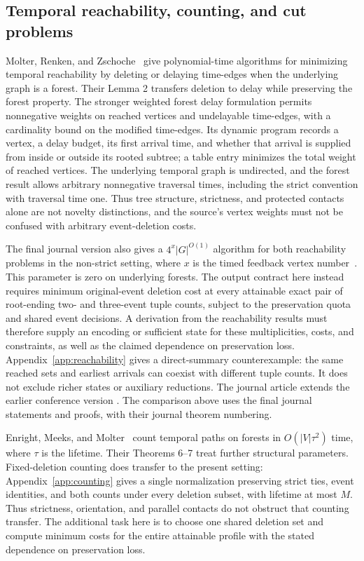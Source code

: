 \subsection{Temporal reachability, counting, and cut problems}

Molter, Renken, and Zschoche~\citep[Theorem 14]{molter2024} give
polynomial-time algorithms for minimizing temporal reachability by deleting
or delaying time-edges when the underlying graph is a forest. Their
Lemma 2 transfers deletion to delay while preserving the forest property.
The stronger weighted forest delay formulation
\citep[Theorem 15, pp.~10--12]{molter2024} permits nonnegative weights on
reached vertices and undelayable time-edges, with a cardinality bound on
the modified time-edges. Its dynamic program records a vertex, a delay
budget, its first arrival time, and whether that arrival is supplied from
inside or outside its rooted subtree; a table entry minimizes the total
weight of reached vertices. The underlying temporal graph is undirected,
and the forest result allows arbitrary nonnegative traversal times,
including the strict convention with traversal time one. Thus tree
structure, strictness, and protected contacts alone are not novelty
distinctions, and the source's vertex weights must not be confused with
arbitrary event-deletion costs.

The final journal version also gives a $4^x|G|^{O(1)}$ algorithm for both
reachability problems in the non-strict setting, where $x$ is the timed
feedback vertex number~\citep[Theorem 16]{molter2024}. This parameter is
zero on underlying forests. The output contract here instead requires
minimum original-event deletion cost at every attainable exact pair of
root-ending two- and three-event tuple counts, subject to the preservation
quota and shared event decisions. A derivation from the reachability
results must therefore supply an encoding or sufficient state for these
multiplicities, costs, and constraints, as well as the claimed dependence
on preservation loss. Appendix~\ref{app:reachability} gives a direct-summary
counterexample: the same reached sets and earliest arrivals can coexist
with different tuple counts. It does not exclude richer states or auxiliary
reductions. The journal article extends the earlier conference version
\citep{molter2021}. The comparison above uses the final journal
statements and proofs, with their journal theorem numbering.

Enright, Meeks, and Molter~\citep[Theorem 2]{enright2025counting} count temporal
paths on forests in $O(|V|\tau^2)$ time, where $\tau$ is the lifetime. Their
Theorems 6--7 treat further structural parameters. Fixed-deletion counting
does transfer to the present setting: Appendix~\ref{app:counting} gives a single
normalization preserving strict ties, event identities, and both counts
under every deletion subset, with lifetime at most $M$. Thus strictness,
orientation, and parallel contacts do not obstruct that counting transfer.
The additional task here is to choose one shared deletion set and compute
minimum costs for the entire attainable profile with the stated dependence
on preservation loss.

